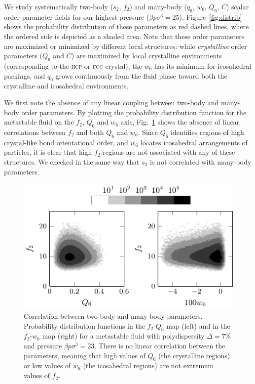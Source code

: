 \documentclass[twocolumn,superscriptaddress]{revtex4}
\begin{document}
We study systematically two-body ($s_2$, $f_2$) and many-body ($q_6$, $w_6$, $Q_6$, $C$) scalar order parameter fields for our highest pressure ($\beta p\sigma^3=25$). Figure~\ref{fig:distrib} shows the probability distribution of these parameters as red dashed lines, where the ordered side is depicted as a shaded area. Note that these order parameters are maximized or minimized by different local structures: while \emph{crystalline} order parameters ($Q_6$ and $C$) are maximized
by local crystalline environments (corresponding to the \textsc{hcp} or \textsc{fcc} crystal), the $w_6$ has its minimum for
icosahedral packings, and $q_6$ grows continuously from the fluid phase toward both the crystalline and icosahedral environments.

We first note the absence of any linear coupling between two-body and many-body order parameters.
By plotting the probability distribution function for the metastable fluid on the $f_2$, $Q_6$ and $w_6$ axis, Fig.~\ref{fig:f2decoupling} shows the absence of linear correlations between $f_2$ and both $Q_6$ and $w_6$. Since $Q_6$ identifies regions of high crystal-like bond orientational order, and $w_6$ locates icosahedral arrangements of particles, it is clear that high $f_2$ regions are not associated with any of these structures. We checked in the same way that $s_2$ is not correlated with many-body parameters.


\begin{figure}
 \centering
 \includegraphics{fig_f2decoupling}
 \caption{Correlation between two-body and many-body parameters. Probability distribution functions in the $f_2$-$Q_6$ map (left) and in the $f_2$-$w_6$ map (right) for a metastable fluid with polydispersity $\Delta=7\%$ and pressure $\beta p\sigma^3=23$. There is no linear correlation between the parameters, meaning
 that high values of $Q_6$ (the crystalline regions) or low values of $w_6$ (the icosahedral regions) are not extremum values of $f_2$.}
 \label{fig:f2decoupling}
\end{figure}
\end{document}
